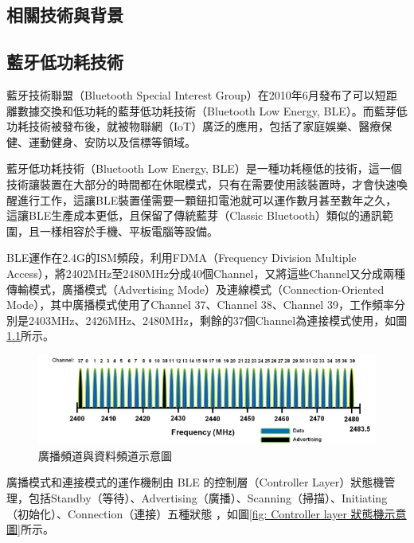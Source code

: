 \begin{ZhChapter}

\chapter{相關技術與背景}

\section{藍牙低功耗技術}

藍牙技術聯盟（Bluetooth Special Interest Group）在2010年6月發布了可以短距離數據交換和低功耗的藍芽低功耗技術（Bluetooth Low Energy, BLE）。而藍芽低功耗技術被發布後，就被物聯網（IoT）廣泛的應用，包括了家庭娛樂、醫療保健、運動健身、安防以及信標等領域。

藍牙低功耗技術（Bluetooth Low Energy, BLE）是一種功耗極低的技術，這一個技術讓裝置在大部分的時間都在休眠模式，只有在需要使用該裝置時，才會快速喚醒進行工作，這讓BLE裝置僅需要一顆鈕扣電池就可以運作數月甚至數年之久，這讓BLE生產成本更低，且保留了傳統藍芽（Classic Bluetooth）類似的通訊範圍，且一樣相容於手機、平板電腦等設備。

BLE運作在2.4G的ISM頻段，利用FDMA（Frequency Division Multiple Access），將2402MHz至2480MHz分成40個Channel，又將這些Channel又分成兩種傳輸模式，廣播模式（Advertising Mode）及連線模式（Connection-Oriented Mode），其中廣播模式使用了Channel 37、Channel 38、Channel 39，工作頻率分別是2403MHz、2426MHz、2480MHz，剩餘的37個Channel為連接模式使用，如圖\ref{fig: 廣播頻道與資料頻道示意圖}所示。

\begin{figure}[H]
    \centering
    \includegraphics[width = 1\textwidth]{image/ble-phy-channel-assignment.png}
    \caption{廣播頻道與資料頻道示意圖\cite{microchip2023}}
    \label{fig: 廣播頻道與資料頻道示意圖}
\end{figure}

廣播模式和連接模式的運作機制由 BLE 的控制層（Controller Layer）狀態機管理，包括Standby（等待）、Advertising（廣播）、Scanning（掃描）、Initiating（初始化）、Connection（連接）五種狀態 ，如圖\ref{fig: Controller layer 狀態機示意圖}所示。


\end{ZhChapter}
